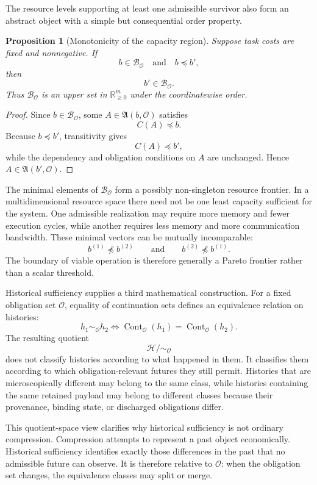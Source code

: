 \documentclass[11pt]{report}
\newtheorem*{frontproposition}{Proposition}
\begin{document}
The resource levels supporting at least one admissible survivor also
form an abstract object with a simple but consequential order property.

\begin{frontproposition}[Monotonicity of the capacity region]
Suppose task costs are fixed and nonnegative. If
\[
b\in\mathcal B_{\mathcal O}
\quad\text{and}\quad
b\preceq b',
\]
then
\[
b'\in\mathcal B_{\mathcal O}.
\]
Thus $\mathcal B_{\mathcal O}$ is an upper set in
$\mathbb R_{\geq 0}^{m}$ under the coordinatewise order.
\end{frontproposition}

\begin{proof}
Since $b\in\mathcal B_{\mathcal O}$, some
$A\in\mathfrak A(b,\mathcal O)$ satisfies
\[
C(A)\preceq b.
\]
Because $b\preceq b'$, transitivity gives
\[
C(A)\preceq b',
\]
while the dependency and obligation conditions on $A$ are unchanged.
Hence $A\in\mathfrak A(b',\mathcal O)$.
\end{proof}

The minimal elements of $\mathcal B_{\mathcal O}$ form a
possibly non-singleton resource frontier. In a multidimensional resource
space there need not be one least capacity sufficient for the system.
One admissible realization may require more memory and fewer execution
cycles, while another requires less memory and more communication
bandwidth. These minimal vectors can be mutually incomparable:
\[
b^{(1)}\npreceq b^{(2)}
\qquad\text{and}\qquad
b^{(2)}\npreceq b^{(1)}.
\]
The boundary of viable operation is therefore generally a Pareto
frontier rather than a scalar threshold.

Historical sufficiency supplies a third mathematical construction. For
a fixed obligation set $\mathcal O$, equality of continuation sets
defines an equivalence relation on histories:
\[
h_1\sim_{\mathcal O}h_2
\iff
\operatorname{Cont}_{\mathcal O}(h_1)
=
\operatorname{Cont}_{\mathcal O}(h_2).
\]
The resulting quotient
\[
\mathcal H/{\sim_{\mathcal O}}
\]
does not classify histories according to what happened in them. It
classifies them according to which obligation-relevant futures they
still permit. Histories that are microscopically different may belong to
the same class, while histories containing the same retained payload may
belong to different classes because their provenance, binding state, or
discharged obligations differ.

This quotient-space view clarifies why historical sufficiency is not
ordinary compression. Compression attempts to represent a past object
economically. Historical sufficiency identifies exactly those
differences in the past that no admissible future can observe. It is
therefore relative to $\mathcal O$: when the obligation set changes, the
equivalence classes may split or merge.
\end{document}
